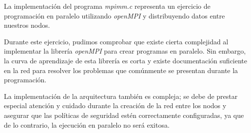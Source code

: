 \documentclass[DIV=calc, paper=letter, fontsize=11pt, twocolumn]{scrartcl}
\begin{document}
La implementación del programa \textit{mpimm.c} representa un ejercicio de programación en paralelo utilizando \textit{openMPI} y distribuyendo datos entre nuestros nodos.

Durante este ejercicio, pudimos comprobar que existe cierta complejidad al implementar la librería \textit{openMPI} para crear programas en paralelo. Sin embargo, la curva de aprendizaje de esta librería es corta y existe documentación suficiente en la red para resolver los problemas que comúnmente se presentan durante la programación.

La implementación de la arquitectura también es compleja; se debe de prestar especial atención y cuidado durante la creación de la red entre los nodos y asegurar que las políticas de seguridad estén correctamente configuradas, ya que de lo contrario, la ejecución en paralelo no será exitosa.
\end{document}
